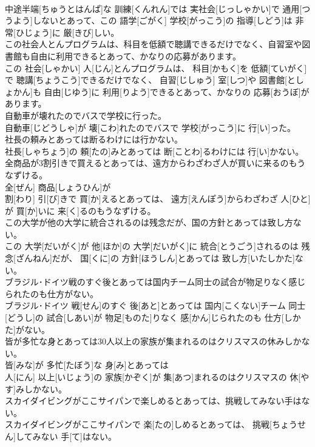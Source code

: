 \documentclass[8pt]{extreport}
\begin{document}
\begin{CJK}{UTF8}{min}
\\	中途半端[ちゅうとはんぱ]な 訓練[くんれん]では 実社会[じっしゃかい]で 通用[つうよう]しないとあって、この 語学[ごがく] 学校[がっこう]の 指導[しどう]は 非常[ひじょう]に 厳[きび]しい。
\\	この社会人とんプログラムは、科目を低額で聴講できるだけでなく、自習室や図書館も自由に利用できるとあって、かなりの応募があります。	
\\	この 社会[しゃかい] 人[じん]とんプログラムは、 科目[かもく]を 低額[ていがく]で 聴講[ちょうこう]できるだけでなく、 自習[じしゅう] 室[しつ]や 図書館[としょかん]も 自由[じゆう]に 利用[りよう]できるとあって、かなりの 応募[おうぼ]があります。
\\	自動車が壊れたのでバスで学校に行った。	
\\	自動車[じどうしゃ]が 壊[こわ]れたのでバスで 学校[がっこう]に 行[い]った。
\\	社長の頼みとあっては断るわけには行かない。	
\\	社長[しゃちょう]の 頼[たの]みとあっては 断[ことわ]るわけには 行[い]かない。
\\	全商品が3割引きで買えるとあっては、遠方からわざわざ人が買いに来るのもうなずける。	
\\	全[ぜん] 商品[しょうひん]が 
\\	割[わり] 引[び]きで 買[か]えるとあっては、 遠方[えんぽう]からわざわざ 人[ひと]が 買[か]いに 来[く]るのもうなずける。
\\	この大学が他の大学に統合されるのは残念だが、国の方針とあっては致し方ない。	
\\	この 大学[だいがく]が 他[ほか]の 大学[だいがく]に 統合[とうごう]されるのは 残念[ざんねん]だが、 国[くに]の 方針[ほうしん]とあっては 致し方[いたしかた]ない。
\\	ブラジル･ドイツ戦のすぐ後とあっては国内チーム同士の試合が物足りなく感じられたのも仕方がない。	
\\	ブラジル･ドイツ 戦[せん]のすぐ 後[あと]とあっては 国内[こくない]チーム 同士[どうし]の 試合[しあい]が 物足[ものた]りなく 感[かん]じられたのも 仕方[しかた]がない。
\\	皆が多忙な身とあっては30人以上の家族が集まれるのはクリスマスの休みしかない。	
\\	皆[みな]が 多忙[たぼう]な 身[み]とあっては 
\\	人[にん] 以上[いじょう]の 家族[かぞく]が 集[あつ]まれるのはクリスマスの 休[やす]みしかない。
\\	スカイダイビングがここサイパンで楽しめるとあっては、挑戦してみない手はない。	
\\	スカイダイビングがここサイパンで 楽[たの]しめるとあっては、 挑戦[ちょうせん]してみない 手[て]はない。

\end{CJK}
\end{document}
